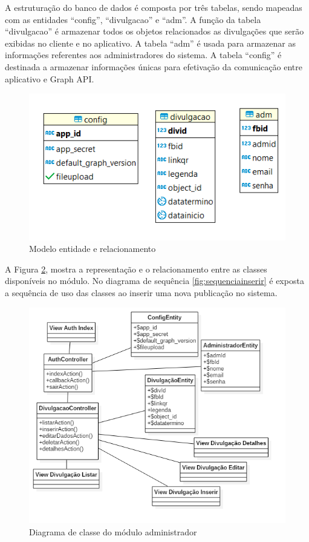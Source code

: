 A estruturação do banco de dados é composta por três tabelas, sendo mapeadas com as entidades ``config'', ``divulgacao'' e ``adm''. A função da tabela ``divulgacao'' é armazenar todos os objetos relacionados as divulgações que serão exibidas no cliente e no aplicativo. A tabela ``adm'' é usada para armazenar as informações referentes aos administradores do sistema. A tabela ``config'' é destinada a armazenar informações únicas para efetivação da comunicação entre aplicativo e Graph API.

\begin{figure}[H]
\centering
\includegraphics[scale=1.2]{figuras/entidaderelacionamento}
\caption{Modelo entidade e relacionamento}
\label{fig:casosDeUso}
\end{figure}

A Figura \ref{fig:diagramaclasseADM}, mostra a representação e o relacionamento entre as classes disponíveis no módulo. No diagrama de sequência \ref{fig:sequenciainserir} é exposta a sequência de uso das classes ao inserir uma nova publicação no sistema. 
\begin{figure}[H]
\centering
\includegraphics[scale=0.7]{figuras/diagramaclasseADM}
\caption{Diagrama de classe do módulo administrador}
\label{fig:diagramaclasseADM}
\end{figure}

